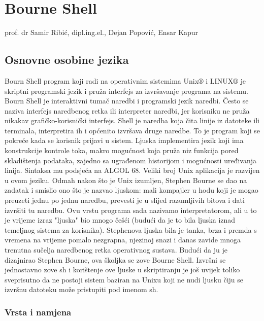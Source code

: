 \documentclass[11pt]{book}
\begin{document}
\setcounter{page}{861}
\setcounter{chapter}{30}

\lstset {language=bash}
\chapter{Bourne Shell}
\begin{center}
 prof. dr Samir Ribić, dipl.ing.el., Dejan Popović, Ensar Kapur
\end{center}

\section{Osnovne osobine jezika}

Bourn Shell program koji radi na operativnim sistemima Unix® i LINUX® je skriptni programski jezik i pruža interfejs za izvršavanje programa na sistemu. Bourn Shell je interaktivni tumač naredbi i programski jezik naredbi. Često se naziva interfejs naredbenog retka ili interpreter naredbi, jer korisniku ne pruža nikakav grafičko-korisnički interfejs. 
Shell je naredba koja čita linije iz datoteke ili terminala, interpretira ih i općenito izvršava druge naredbe. To je program koji se pokreće kada se korisnik prijavi u sistem. Ljuska implementira jezik koji ima konstrukcije kontrole toka, makro mogućnost koja pruža niz funkcija pored skladištenja podataka, zajedno sa ugrađenom historijom i mogućnosti uređivanja linija. Sintaksa mu podsjeća na ALGOL 68. Veliki broj Unix aplikacija je razvijen u ovom jeziku.
Odmah nakon što je Unix izumljen, Stephen Bourne se dao na zadatak i smislio ono što je nazvao ljuskom: mali kompajler u hodu koji je mogao preuzeti jednu po jednu naredbu, prevesti je u slijed razumljivih bitova i dati izvršiti tu naredbu. Ovu vrstu programa sada nazivamo interpretatorom, ali u to je vrijeme izraz "ljuska" bio mnogo češći (budući da je to bila ljuska iznad temeljnog sistema za korisnika). Stephenova ljuska bila je tanka, brza i premda s vremena na vrijeme pomalo nezgrapna, njezinoj snazi i danas zavide mnoga trenutna sučelja naredbenog retka operativnog sustava. Budući da ju je dizajnirao Stephen Bourne, ova školjka se zove Bourne Shell. Izvršni se jednostavno zove sh i korištenje ove ljuske u skriptiranju je još uvijek toliko sveprisutno da ne postoji sistem baziran na Unixu  koji ne nudi ljusku čiju se izvršnu datoteku može pristupiti pod imenom sh.
 
\subsection{Vrsta i namjena}
\end{document}
